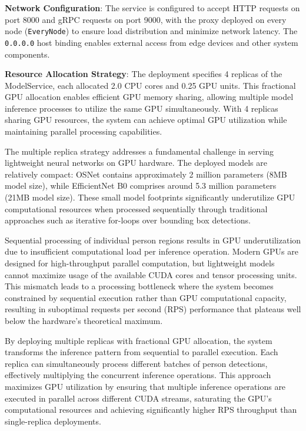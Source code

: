 \textbf{Network Configuration}: The service is configured to accept HTTP requests on port 8000 and gRPC requests on port 9000, with the proxy deployed on every node (\texttt{EveryNode}) to ensure load distribution and minimize network latency. The \texttt{0.0.0.0} host binding enables external access from edge devices and other system components.

\textbf{Resource Allocation Strategy}: The deployment specifies 4 replicas of the ModelService, each allocated 2.0 CPU cores and 0.25 GPU units. This fractional GPU allocation enables efficient GPU memory sharing, allowing multiple model inference processes to utilize the same GPU simultaneously. With 4 replicas sharing GPU resources, the system can achieve optimal GPU utilization while maintaining parallel processing capabilities.

The multiple replica strategy addresses a fundamental challenge in serving lightweight neural networks on GPU hardware. The deployed models are relatively compact: OSNet contains approximately 2 million parameters (8MB model size), while EfficientNet B0 comprises around 5.3 million parameters (21MB model size). These small model footprints significantly underutilize GPU computational resources when processed sequentially through traditional approaches such as iterative for-loops over bounding box detections.

Sequential processing of individual person regions results in GPU underutilization due to insufficient computational load per inference operation. Modern GPUs are designed for high-throughput parallel computation, but lightweight models cannot maximize usage of the available CUDA cores and tensor processing units. This mismatch leads to a processing bottleneck where the system becomes constrained by sequential execution rather than GPU computational capacity, resulting in suboptimal requests per second (RPS) performance that plateaus well below the hardware's theoretical maximum.

By deploying multiple replicas with fractional GPU allocation, the system transforms the inference pattern from sequential to parallel execution. Each replica can simultaneously process different batches of person detections, effectively multiplying the concurrent inference operations. This approach maximizes GPU utilization by ensuring that multiple inference operations are executed in parallel across different CUDA streams, saturating the GPU's computational resources and achieving significantly higher RPS throughput than single-replica deployments.

